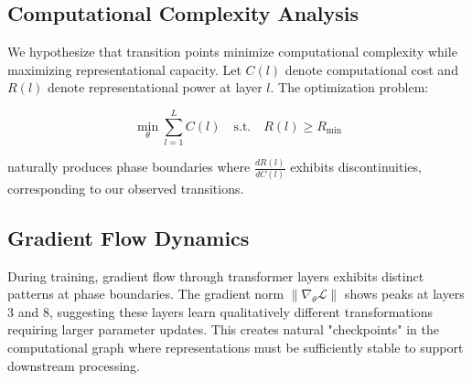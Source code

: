\subsection{Computational Complexity Analysis}

We hypothesize that transition points minimize computational complexity while maximizing representational capacity. Let $C(l)$ denote computational cost and $R(l)$ denote representational power at layer $l$. The optimization problem:

\begin{equation}
\min_{\theta} \sum_{l=1}^{L} C(l) \quad \text{s.t.} \quad R(l) \geq R_{\text{min}}
\end{equation}

naturally produces phase boundaries where $\frac{dR(l)}{dC(l)}$ exhibits discontinuities, corresponding to our observed transitions.

\subsection{Gradient Flow Dynamics}

During training, gradient flow through transformer layers exhibits distinct patterns at phase boundaries. The gradient norm $\|\nabla_{\theta} \mathcal{L}\|$ shows peaks at layers 3 and 8, suggesting these layers learn qualitatively different transformations requiring larger parameter updates. This creates natural "checkpoints" in the computational graph where representations must be sufficiently stable to support downstream processing.